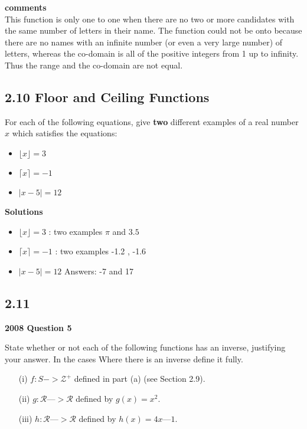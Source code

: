 \documentclass[12 pt]{article}
\begin{document}
\textbf{comments}\\
This function is only one to one when there are no two or more
candidates with the same number of letters in their name. The function
could not be onto because there are no names with an infinite number (or even a very large number) of letters, whereas the co-domain is all of the
positive integers from 1 up to infinity. Thus the range and the co-domain
are not equal.

\subsection*{2.10 Floor and Ceiling Functions}


For each of the following equations, give \textbf{two} different examples of a real number $x$ which 
satisfies the equations:
\begin{itemize}
\item $\lfloor x \rfloor = 3 $
\item $\lceil x \rceil = -1 $
\item $| x-5 | =12 $
\end{itemize}

\textbf{Solutions}
\begin{itemize}
\item $\lfloor x \rfloor = 3 $ : two examples $\pi$ and $3.5$
\item $\lceil x \rceil = -1 $ : two examples -1.2 , -1.6
\item $| x-5 | =12 $  Answers: -7 and 17
\end{itemize}



\subsection{2.11}
\textbf{2008 Question 5}

State whether or not each of the following functions has an inverse, justifying your answer. In the cases Where there is an inverse deﬁne it fully.

\begin{itemize}
\item[(i)] $f : S -> \mathcal{Z}^{+} $ deﬁned in part (a) (see Section 2.9).
\item[(ii)] $g : \mathcal{R} —> \mathcal{R} $ deﬁned by $g(x) = x^2$.
\item[(iii)] $h : \mathcal{R} —> \mathcal{R} $ deﬁned by $h(x) = 4x — 1. $
\end{itemize}
\end{document}
